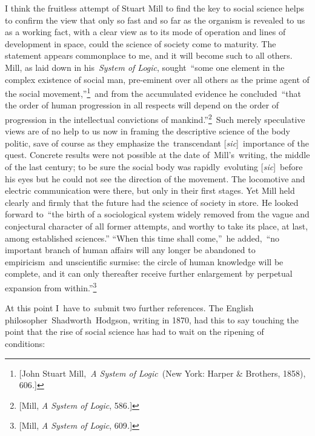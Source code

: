 \documentclass[twoside,symmetric,nobib,justified]{tufte-book}
\begin{document}
I think the fruitless attempt of Stuart Mill to find the key to social
science helps to confirm the view that only so fast and so far as the
organism is revealed to us as a working fact, with a clear view as to
its mode of operation and lines of development in space, could the
science of society come to maturity. The statement appears commonplace
to me, and it will become such to all others. Mill, as laid down in
his~\emph{System of Logic}, sought~``some one element in the complex
existence of social man, pre-eminent over all others as the prime agent
of the social movement,''\footnote{{[}John Stuart Mill,~\emph{A System
  of Logic~}(New York: Harper \& Brothers, 1858), 606\emph{.}{]}}~and
from the accumulated evidence he concluded~``that the order of human
progression in all respects will depend on the order of progression in
the intellectual convictions of mankind.''\footnote{{[}Mill, \emph{A
  System of Logic}, 586\emph{.}{]}}~Such merely speculative views are of
no help to us now in framing the descriptive science of the body
politic, save of course as they emphasize the~transcendant
{[}\emph{sic}{]}~importance of the quest. Concrete results were not
possible at the date of~Mill's~writing, the middle of the last century;
to be sure the social body was rapidly~evoluting {[}\emph{sic}{]}~before
his eyes but he could not see the direction of the movement. The
locomotive and electric communication were there, but only in their
first stages. Yet Mill held clearly and firmly that the future had the
science of society in store. He looked forward to~``the birth of a
sociological system widely removed from the vague and conjectural
character of all former attempts, and worthy to take its place, at last,
among established sciences.'' ``When this time shall come,''~he
added,~``no important branch of human affairs will any longer be
abandoned to empiricism~and unscientific surmise: the circle of human
knowledge will be complete, and it can only thereafter receive further
enlargement by perpetual expansion from within.''\footnote{{[}Mill,
  \emph{A System of Logic}, 609\emph{.}{]}}~

At this point I~have to~submit two further references. The English
philosopher~Shadworth~Hodgson, writing in 1870, had this to say touching
the point that the rise of social science has had to wait on the
ripening of conditions:~
\end{document}
